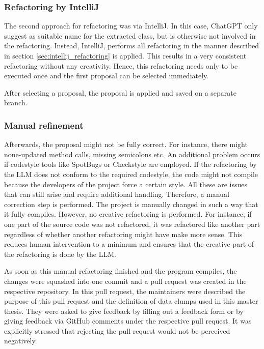 \subsubsection{Refactoring by IntelliJ}

The second approach for refactoring was via IntelliJ. In this case, ChatGPT only suggest as suitable name for the extracted class, but is otherwise not involved in the refactoring. Instead, IntelliJ, performs all refactoring in the manner described in section  \ref{sec:intellij_refactoring} is applied. This results in a very consistent refactoring without any creativity. Hence, this refactoring needs only to be executed once and the first proposal can be selected immediately. 

After selecting a proposal, the proposal is applied and saved on a separate branch.

\subsubsection{Manual refinement}

Afterwards, the proposal might not be fully correct. For instance, there might none-updated method calls, missing semicolons etc. An additional problem occurs if codestyle tools like SpotBugs or Checkstyle are employed. If the refactoring by the \ac{LLM} does not conform to the required codestyle, the code might not compile because the developers of the project force a certain style. All these are issues that can still arise and require additional handling. Therefore, a manual correction step is performed. The project is  manually changed in such a way that it fully compiles. However, no creative refactoring is performed. For instance, if one part of the source code was not refactored, it was refactored like another part regardless of whether another refactoring might have make more sense. This reduces human intervention to a minimum and ensures that the creative part of the refactoring is done by the \ac{LLM}. 

As soon as this manual refactoring finished and the program compiles, the changes were squashed into one commit and a pull request was created in the respective repository. In this pull request, the maintainers were described the purpose of this pull request and  the definition of data clumps used in this master thesis. They were asked to give feedback by filling out a feedback form or by giving feedback via GitHub comments under the respective pull request. It was explicitly stressed that rejecting the pull request would not be perceived negatively. 

